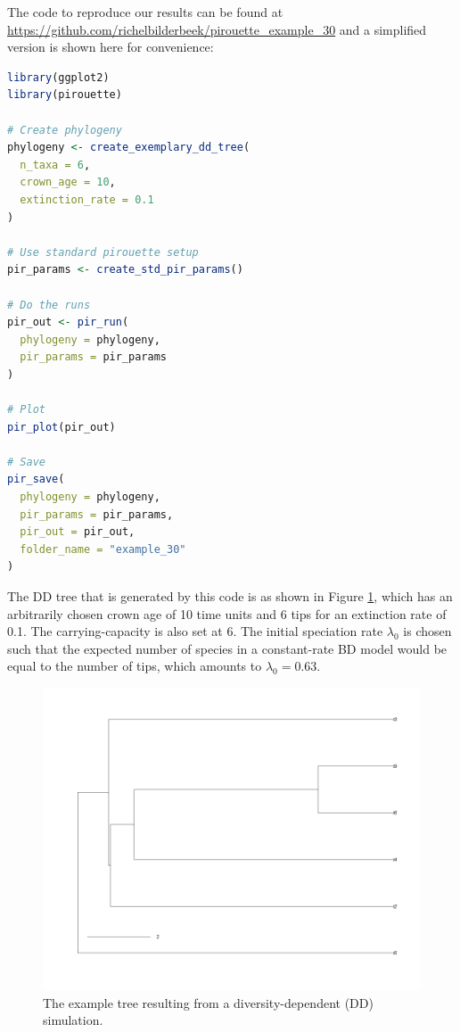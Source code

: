 The code to reproduce our results can be found at  
\url{https://github.com/richelbilderbeek/pirouette_example_30}
and a simplified version is shown here for convenience:

\begin{lstlisting}[language=R]
library(ggplot2)
library(pirouette)

# Create phylogeny
phylogeny <- create_exemplary_dd_tree(
  n_taxa = 6, 
  crown_age = 10,
  extinction_rate = 0.1
)

# Use standard pirouette setup
pir_params <- create_std_pir_params()

# Do the runs
pir_out <- pir_run(
  phylogeny = phylogeny,
  pir_params = pir_params
)

# Plot
pir_plot(pir_out)

# Save
pir_save(
  phylogeny = phylogeny,
  pir_params = pir_params,
  pir_out = pir_out,
  folder_name = "example_30"
)
\end{lstlisting}

The DD tree that is generated by this code is as shown in Figure \ref{fig:dd_tree},
which has an arbitrarily chosen crown age of 10 time units and 6 tips 
for an extinction rate of 0.1. The carrying-capacity is also set at 6. The initial speciation rate $\lambda_0$ is chosen such that the expected number of species in a constant-rate BD model would be equal to the number of tips, which amounts to $\lambda_0 = 0.63$.

\begin{figure}[H]
  \includegraphics[width=\textwidth]{pirouette_example_30/example_30_314/true_tree.png}
  \caption{
    The example tree resulting from a diversity-dependent (DD) simulation.
  }
  \label{fig:dd_tree}
\end{figure}

